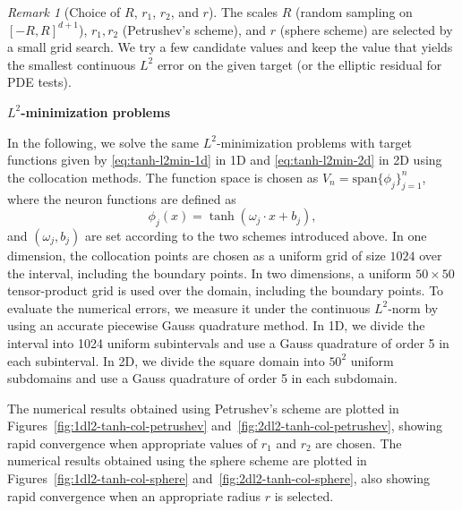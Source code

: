 \documentclass{article}
\theoremstyle{remark}
\newtheorem{remark}{Remark}
\begin{document}
{\color{blue}
\begin{remark}[Choice of $R$, $r_1$, $r_2$, and $r$]
\label{rem:radius-tuning}
The scales $R$ (random sampling on $[-R,R]^{d+1}$), $r_1,r_2$ (Petrushev's scheme), and $r$ (sphere scheme) are selected by a small grid search.
We try a few candidate values and keep the value that yields the smallest continuous $L^2$ error on the given target (or the elliptic residual for PDE tests).
\end{remark}
}

\textbf{$L^2$-minimization problems}

In the following, we solve the same $L^2$-minimization problems with target functions given by \eqref{eq:tanh-l2min-1d} in 1D and \eqref{eq:tanh-l2min-2d} in 2D using the collocation methods. 
The function space is chosen as $V_n = \mathrm{span}\{\phi_j\}_{j=1}^n$, 
where the neuron functions are defined as
\[
\phi_j(x) = \tanh(\omega_j \cdot x + b_j),
\]
and $(\omega_j,b_j)$ are set according to the two schemes introduced above. 
In one dimension, the collocation points are chosen as a uniform grid of size $1024$ over the interval, including the boundary points. 
In two dimensions, a uniform $50\times50$ tensor-product grid is used over the domain, including the boundary points. 
To evaluate the numerical errors, we measure it under the continuous $L^2$-norm by using an accurate piecewise Gauss quadrature method. 
In 1D, we divide the interval into 1024 uniform subintervals and use a Gauss quadrature of order 5 in each subinterval.
In 2D, we divide the square domain into $50^2$ uniform subdomains and use a Gauss quadrature of order 5 in each subdomain.

The numerical results obtained using Petrushev's scheme are plotted in Figures~\ref{fig:1dl2-tanh-col-petrushev} and~\ref{fig:2dl2-tanh-col-petrushev}, showing rapid convergence when appropriate values of $r_1$ and $r_2$ are chosen. 
The numerical results obtained using the sphere scheme are plotted in Figures~\ref{fig:1dl2-tanh-col-sphere} and~\ref{fig:2dl2-tanh-col-sphere}, also showing rapid convergence when an appropriate radius $r$ is selected. 

\end{document}
